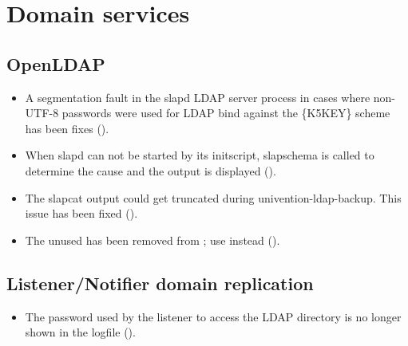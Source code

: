 \section{Domain services}

\subsection{OpenLDAP}
\begin{itemize}
\item A segmentation fault in the slapd LDAP server process in cases where
non-UTF-8 passwords were used for LDAP bind against the \{K5KEY\} scheme has
been fixes ().

\item When slapd can not be started by its initscript, slapschema is called to determine the cause and the output is displayed ().

\item The slapcat output could get truncated during univention-ldap-backup.
This issue has been fixed ().

\item The unused  has been removed from ; use  instead ().
\end{itemize}



\subsection{Listener/Notifier domain replication}
\begin{itemize}
\item The password used by the listener to access the LDAP directory is no longer shown in the logfile ().
\end{itemize}

